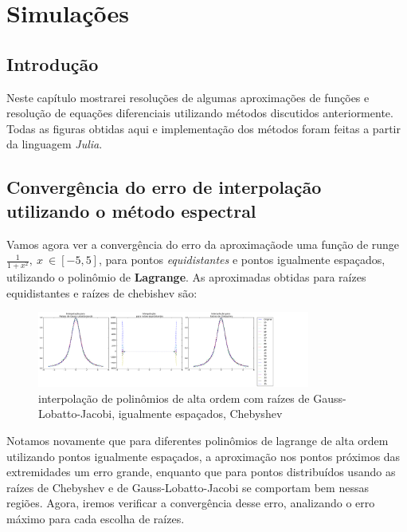 \chapter{Simulações}
\label{cap:III}
\section{Introdução}
 Neste capítulo mostrarei resoluções de algumas aproximações de funções e resolução de equações diferenciais utilizando métodos discutidos anteriormente. Todas as figuras obtidas aqui e implementação dos métodos foram feitas a partir da linguagem \emph{Julia}.

\section{Convergência do erro de interpolação utilizando o método espectral}
	Vamos agora ver a convergência do erro da aproximaçãode uma função de runge $\frac{1}{1+x^2},\ x\ \in [-5,5]$, para pontos \emph{equidistantes} e pontos igualmente espaçados, utilizando o polinômio de \textbf{Lagrange}.
	As aproximadas obtidas para raízes equidistantes e raízes de chebishev são:\\	
\begin{figure}[!ht]
  \includegraphics[width=0.8\textwidth,center]{figuras/interpolacao_todas.png}
  \caption{interpolação de polinômios de alta ordem com raízes de Gauss-Lobatto-Jacobi, igualmente espaçados, Chebyshev}
\end{figure}
Notamos novamente que para diferentes  polinômios de lagrange de alta ordem utilizando pontos igualmente espaçados, a aproximação nos pontos próximos das extremidades um erro  grande, enquanto que para pontos distribuídos usando as raízes de Chebyshev e de Gauss-Lobatto-Jacobi se comportam bem nessas regiões. Agora, iremos verificar a convergência desse erro, analizando o erro máximo para cada escolha de raízes.

